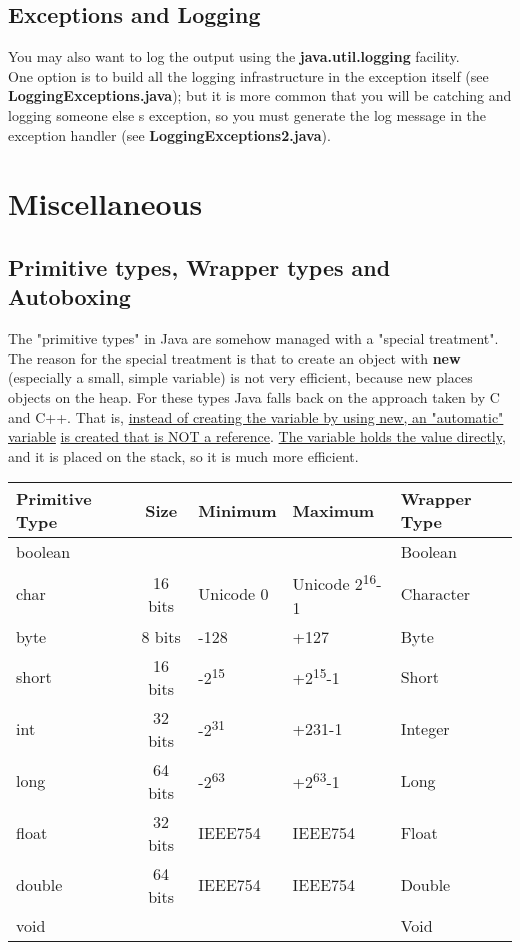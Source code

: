 \documentclass[10pt,letterpaper]{report}
\begin{document}
\section{Exceptions and Logging}
You may also want to log the output using the \textbf{java.util.logging} facility.\\
One option is to build all the logging infrastructure in the exception itself (see \textbf{LoggingExceptions.java}); but it is more common that you will be catching and logging someone else \textquotesingle s exception, so you must generate the log message in the exception handler (see \textbf{LoggingExceptions2.java}).

\chapter{Miscellaneous}
\section{Primitive types, Wrapper types and Autoboxing}

The "primitive types" in Java are somehow managed with a "special treatment".\\
The reason for the special treatment is that to create an object with \textbf{new} (especially a small, simple variable) is not very efficient, because new places objects on the heap. For these types Java falls back on the approach taken by C and C++. That is, \underline{instead of creating the variable by using new, an "automatic" variable} \underline{is created that is NOT a reference}. \underline{The variable holds the value directly}, and it is placed on the stack, so it is much more efficient.\\

\begin{tabular}{l | c | l | l | l }
    \hline
\textbf{Primitive Type} & \textbf{Size} & \textbf{Minimum} & \textbf{Maximum} & \textbf{Wrapper Type} \\ \hline
boolean &   &   &   & Boolean \\ \hline
char & 16 bits & Unicode 0 & Unicode 2\textsuperscript{16}-1 & Character \\ \hline
byte & 8 bits & -128 & +127 & Byte \\ \hline
short & 16 bits & -2\textsuperscript{15} & +2\textsuperscript{15}-1 & Short \\ \hline
int & 32 bits & -2\textsuperscript{31} & +2{31}-1 & Integer \\ \hline
long & 64 bits & -2\textsuperscript{63} & +2\textsuperscript{63}-1 & Long \\ \hline
float & 32 bits & IEEE754 & IEEE754 & Float \\ \hline
double & 64 bits & IEEE754 & IEEE754 & Double \\ \hline
void &  &  &  & Void \\ \hline

\end{tabular}
\\
\\
\end{document}
